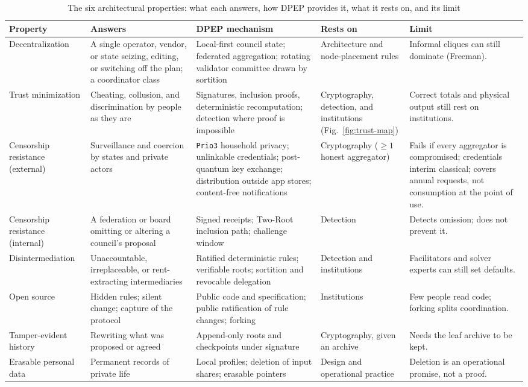 \documentclass[10pt,twoside,openany]{book}
\theoremstyle{dpepstyle}
\begin{document}
\begin{table}[htbp]
\centering
\caption{The six architectural properties: what each answers, how DPEP provides it, what it rests on, and its limit}
\label{tab:properties}
\scriptsize
\setlength{\tabcolsep}{3pt}
\begin{tabularx}{\textwidth}{L{0.86in} L{0.9in} Y L{0.66in} L{0.9in}}
\toprule
\textbf{Property} & \textbf{Answers} & \textbf{DPEP mechanism} & \textbf{Rests on} & \textbf{Limit} \\
\midrule
Decentralization & A single operator, vendor, or state seizing, editing, or switching off the plan; a coordinator class & Local-first council state; federated aggregation; rotating validator committee drawn by sortition & Architecture and node-placement rules & Informal cliques can still dominate (Freeman). \\
Trust minimization & Cheating, collusion, and discrimination by people as they are & Signatures, inclusion proofs, deterministic recomputation; detection where proof is impossible & Cryptography, detection, and institutions (Fig.~\ref{fig:trust-map}) & Correct totals and physical output still rest on institutions. \\
Censorship resistance (external) & Surveillance and coercion by states and private actors & \texttt{Prio3} household privacy; unlinkable credentials; post-quantum key exchange; distribution outside app stores; content-free notifications & Cryptography ($\ge 1$ honest aggregator) & Fails if every aggregator is compromised; credentials interim classical; covers annual requests, not consumption at the point of use. \\
Censorship resistance (internal) & A federation or board omitting or altering a council's proposal & Signed receipts; Two-Root inclusion path; challenge window & Detection & Detects omission; does not prevent it. \\
Disintermediation & Unaccountable, irreplaceable, or rent-extracting intermediaries & Ratified deterministic rules; verifiable roots; sortition and revocable delegation & Detection and institutions & Facilitators and solver experts can still set defaults. \\
Open source & Hidden rules; silent change; capture of the protocol & Public code and specification; public ratification of rule changes; forking & Institutions & Few people read code; forking splits coordination. \\
Tamper-evident history & Rewriting what was proposed or agreed & Append-only roots and checkpoints under signature & Cryptography, given an archive & Needs the leaf archive to be kept. \\
Erasable personal data & Permanent records of private life & Local profiles; deletion of input shares; erasable pointers & Design and operational practice & Deletion is an operational promise, not a proof. \\
\bottomrule
\end{tabularx}
\end{table}
\end{document}

